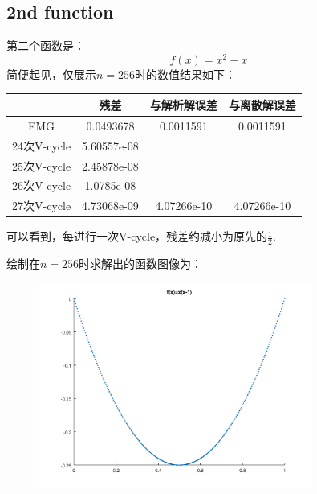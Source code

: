 \documentclass[a4paper,11.5pt,UTF8]{ctexart}
\begin{document}
\begin{large}
\subsection{2nd function}
\par 第二个函数是：$$f(x)=x^2-x$$
简便起见，仅展示$n=256$时的数值结果如下：
\begin{center}
	\begin{tabular}{|c|c|c|c|}
		\hline
		& 残差 & 与解析解误差 & 与离散解误差 \\
		\hline
		FMG & 0.0493678 & 0.0011591 & 0.0011591 \\
		\hline
		24次V-cycle & 5.60557e-08 & ~ & ~ \\
		\hline
		25次V-cycle & 2.45878e-08 & ~ & ~ \\
		\hline
		26次V-cycle & 1.0785e-08 & ~ & ~ \\
		\hline
		27次V-cycle & 4.73068e-09 & 4.07266e-10 & 4.07266e-10 \\
		\hline
	\end{tabular}
\end{center}
可以看到，每进行一次V-cycle，残差约减小为原先的$\frac{1}{2}$.
\par 绘制在$n=256$时求解出的函数图像为：
\begin{figure}[H]
	\centering
	\includegraphics[width=0.8\textwidth,height=0.6\textwidth]{../output/figure/dim1_2.png}
\end{figure}


\end{large}
\end{document}
